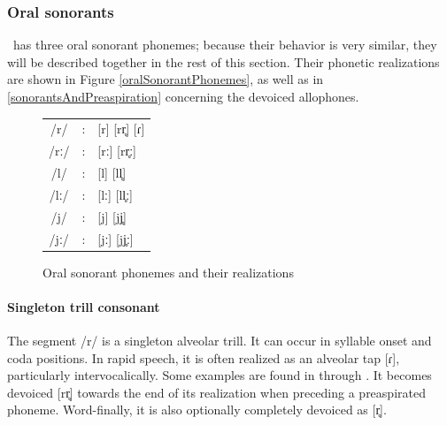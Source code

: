 \subsubsection{Oral sonorants}\label{oralSonorants}%
\PS\ has three oral sonorant phonemes; %
because their behavior is very similar, they will be described together in the rest of this section. 
Their phonetic realizations are shown in Figure \vref{oralSonorantPhonemes}, as well as in \SEC\ref{sonorantsAndPreaspiration} concerning the devoiced allophones. 
\begin{figure}[h]\centering
\begin{tabular}{c c l}
/r/ &:& [r] [rr̥] [ɾ]\\ %
/rː/ &:& [rː] [rr̥ː] \\ %
/l/ &:& [l] [ll̥]\\ %
/lː/ &:& [lː] [ll̥ː]\\ %
/j/ &:& [j] [jj̥] \\ %
/jː/ &:& [jː] [jj̥ː] \\ %
\end{tabular}
\caption{Oral sonorant phonemes and their realizations}\label{oralSonorantPhonemes}%
\end{figure}


\paragraph{Singleton trill consonant}
The segment /r/ is a singleton alveolar trill. It can occur in syllable onset and coda positions. %
In rapid speech, it is often realized as an alveolar tap [ɾ], particularly intervocalically. Some examples are found in  through . It becomes devoiced [rr̥] towards the end of its realization when preceding a preaspirated phoneme. 
Word-finally, it is also optionally completely devoiced as [r̥].%

